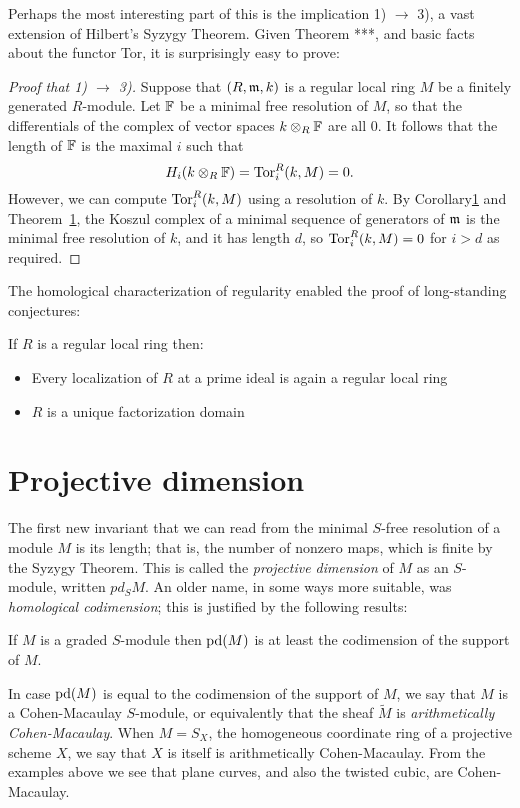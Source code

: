 Perhaps the most interesting part of this is the implication 1) $\to$ 3), a vast extension of Hilbert's Syzygy Theorem.
Given Theorem ***, and basic facts about the functor Tor, it is surprisingly easy to prove:

\begin{proof} [Proof that 1) $\to$ 3)] Suppose that $(R,\gm,k)$ is a regular local ring $M$ be a finitely generated
 $R$-module. Let $\FF$ be a minimal free resolution of $M$, so that the differentials of the complex of vector
 spaces $k\otimes_{R}\FF$ are all 0. It follows that the length of $\FF$ is the maximal $i$ such that
 $$
 H_{i}(k\otimes_{R}\FF) = \Tor_{i}^{R}(k,M) = 0.
 $$
 However, we can compute $\Tor_{i}^{R}(k,M)$ using a resolution of $k$. By Corollary\ref{} and 
 Theorem~\ref{},  the Koszul complex of a minimal sequence of generators of $\gm$  is the minimal free resolution of $k$, and it has length $d$, so $\Tor_{i}^{R}(k,M) = 0$ for $i>d$ as required.
\end{proof}

 The homological characterization of regularity enabled the proof of long-standing conjectures:
\begin{theorem} \cite{AB} If $R$ is a regular local ring then:
\begin{itemize}
 \item Every localization of $R$ at a prime ideal is again a regular local ring
  \item  $R$ is a unique factorization  domain
\end{itemize}
 \end{theorem}
 
 \section{Projective dimension}
The first new invariant that we can read from the minimal $S$-free resolution of a module $M$ is its length; that is, the number of nonzero maps, which is finite by the Syzygy Theorem. This is called the \emph{projective dimension} of $M$ as an $S$-module, written $pd_{S}M$. An older name, in some ways more suitable, was \emph{homological codimension}; this is justified by the following results:

\begin{proposition}\label{pd lower bound}
If $M$ is a graded $S$-module then $\pd(M)$ is at least the codimension of the support of $M$.
\end{proposition}

In case $\pd(M)$ is equal to the codimension of the support of $M$, we say that $M$ is a
Cohen-Macaulay $S$-module, or equivalently that the sheaf $\widetilde M$ is 
\emph{arithmetically Cohen-Macaulay}. When $M = S_{X}$, the homogeneous coordinate ring of a projective scheme $X$, we say that $X$ is itself is arithmetically Cohen-Macaulay. From the examples above we see that plane curves, and also the twisted cubic, are Cohen-Macaulay.

